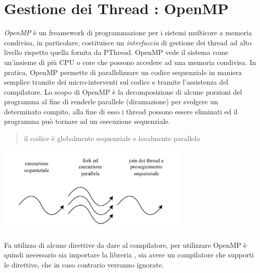\documentclass[10pt, letterpaper]{report}
\begin{document}
\chapter{Gestione dei Thread : OpenMP}
\textit{OpenMP} è un freamework di programmazione per i sistemi multicore a memoria condivisa, in particolare, costituisce un \textit{interfaccia} di gestione dei thread ad alto livello rispetto quella fornita da PThread. OpenMP vede il sistema come un'insieme di più CPU o core che possono accedere ad una memoria condivisa. In pratica, OpenMP permette di parallelizzare un codice sequenziale in maniera semplice tramite dei micro-interventi sul codice e  tramite l'assistenza del compilatore.\acc 
Lo scopo di OpenMP è la decomposizione di alcune porzioni del programma al fine di renderle parallele (diramazione) per svolgere un determinato compito, alla fine di esso i thread possono essere eliminati ed il programma può tornare ad un esecuzione sequenziale.\begin{quote}
    il codice è globalmente sequenziale e localmente parallelo
\end{quote}
\begin{center}
    \includegraphics[width=0.7\textwidth ]{images/openMP.pdf}
\end{center}
Fa utilizzo di alcune direttive da dare al compilatore, per utilizzare OpenMP è quindi necessario sia importare la libreria , sia avere un compilatore che supporti le direttive, che in caso contrario verranno ignorate.
\end{document}
